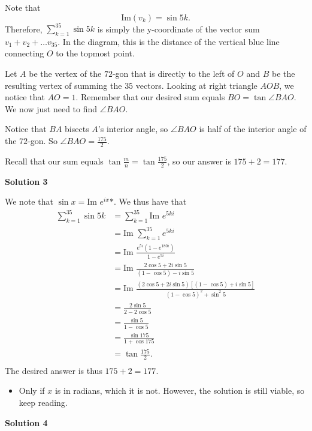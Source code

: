 \begin{enumerate}
 Note that
 \[\text{Im}(v_k) = \sin{5k}.\] Therefore, $\sum_{k=1}^{35}\sin 5k$ is simply the y-coordinate of the vector sum $v_1 + v_2 + \dots v_{35}$. In the diagram, this is the distance of the vertical blue line connecting $O$ to the topmost point.

 Let $A$ be the vertex of the $72$-gon that is directly to the left of $O$ and $B$ be the resulting vertex of summing the $35$ vectors. Looking at right triangle $AOB$, we notice that $AO=1$. Remember that our desired sum equals $BO = \tan{\angle BAO}.$ We now just need to find $\angle BAO$.

 Notice that $BA$ bisects $A$'s interior angle, so $\angle BAO$ is half of the interior angle of the $72$-gon. So $\angle BAO = \frac{175}{2}$.

 Recall that our sum equals $\tan{\frac{m}{n}} = \tan{\frac{175}{2}}$, so our answer is $175 + 2 = \boxed{177}$.

 



\textbf{Solution 3}

We note that $\sin x = \mbox{Im } e^{ix}\text{*}$. We thus have that
 \begin{align*} \sum_{k = 1}^{35} \sin 5k &= \sum_{k = 1}^{35} \mbox{Im } e^{5ki}\\ &= \mbox{Im } \sum_{k = 1}^{35} e^{5ki}\\ &= \mbox{Im } \frac{e^{5i}(1 - e^{180i})}{1 - e^{5i}}\\ &= \mbox{Im } \frac{2\cos5 + 2i \sin 5}{(1 - \cos 5) - i \sin 5}\\ &= \mbox{Im } \frac{(2 \cos 5 + 2i \sin 5)[(1 - \cos 5) + i \sin 5]}{(1 - \cos 5)^2 + \sin^2 5}\\ &= \frac{2 \sin 5}{2 - 2 \cos 5}\\ &= \frac{\sin 5}{1 - \cos 5}\\ &= \frac{\sin 175}{1 + \cos 175} \\ &= \tan \frac{175}{2}.\\ \end{align*}
The desired answer is thus $175 + 2 = \boxed{177}$.

 
            \begin{itemize}
        \item Only if $x$ is in radians, which it is not. However, the solution is still viable, so keep reading.
            \end{itemize}
            



\textbf{Solution 4}


\end{enumerate}
